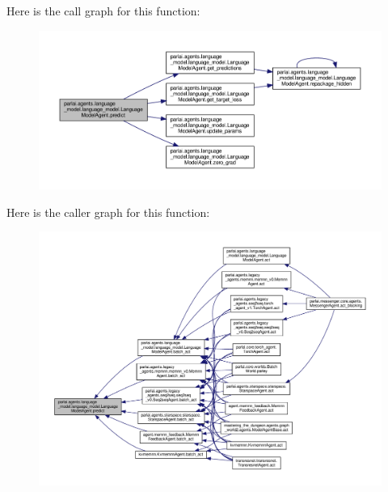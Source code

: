 Here is the call graph for this function\+:
\nopagebreak
\begin{figure}[H]
\begin{center}
\leavevmode
\includegraphics[width=350pt]{classparlai_1_1agents_1_1language__model_1_1language__model_1_1LanguageModelAgent_a1ff4e6849d50eb9d58a2f97a91d715ce_cgraph}
\end{center}
\end{figure}
Here is the caller graph for this function\+:
\nopagebreak
\begin{figure}[H]
\begin{center}
\leavevmode
\includegraphics[width=350pt]{classparlai_1_1agents_1_1language__model_1_1language__model_1_1LanguageModelAgent_a1ff4e6849d50eb9d58a2f97a91d715ce_icgraph}
\end{center}
\end{figure}
\mbox{\label{classparlai_1_1agents_1_1language__model_1_1language__model_1_1LanguageModelAgent_a058d0497a88662c2d523b3b5a836a0bb}} 
